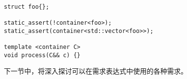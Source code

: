 \begin{lstlisting}[style=styleCXX]
struct foo{};

static_assert(!container<foo>);
static_assert(container<std::vector<foo>>);

template <container C>
void process(C&& c) {}
\end{lstlisting}

下一节中，将深入探讨可以在需求表达式中使用的各种需求。


























